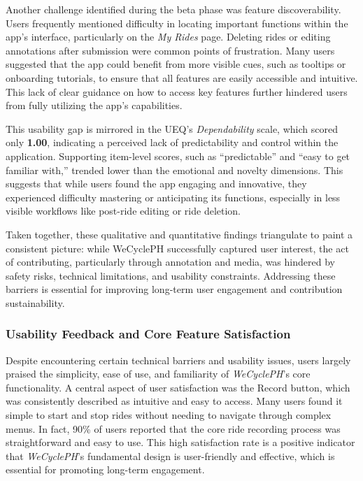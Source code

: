 Another challenge identified during the beta phase was feature discoverability. Users frequently mentioned difficulty in locating important functions within the app's interface, particularly on the \textit{My Rides} page. Deleting rides or editing annotations after submission were common points of frustration. Many users suggested that the app could benefit from more visible cues, such as tooltips or onboarding tutorials, to ensure that all features are easily accessible and intuitive. This lack of clear guidance on how to access key features further hindered users from fully utilizing the app's capabilities.

This usability gap is mirrored in the UEQ's \textit{Dependability} scale, which scored only \textbf{1.00}, indicating a perceived lack of predictability and control within the application. Supporting item-level scores, such as ``predictable'' and ``easy to get familiar with,'' trended lower than the emotional and novelty dimensions. This suggests that while users found the app engaging and innovative, they experienced difficulty mastering or anticipating its functions, especially in less visible workflows like post-ride editing or ride deletion.

Taken together, these qualitative and quantitative findings triangulate to paint a consistent picture: while WeCyclePH successfully captured user interest, the act of contributing, particularly through annotation and media, was hindered by safety risks, technical limitations, and usability constraints. Addressing these barriers is essential for improving long-term user engagement and contribution sustainability.



\subsubsection{Usability Feedback and Core Feature Satisfaction}

Despite encountering certain technical barriers and usability issues, users largely praised the simplicity, ease of use, and familiarity of \textit{WeCyclePH}'s core functionality. A central aspect of user satisfaction was the Record button, which was consistently described as intuitive and easy to access. Many users found it simple to start and stop rides without needing to navigate through complex menus. In fact, 90\% of users reported that the core ride recording process was straightforward and easy to use. This high satisfaction rate is a positive indicator that \textit{WeCyclePH}'s fundamental design is user-friendly and effective, which is essential for promoting long-term engagement.

